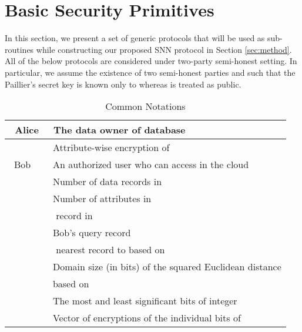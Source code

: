 \documentclass{article}
\begin{document}
\section{ Basic Security Primitives}\label{sec:sub-methods}
In this section, we present a set of generic protocols that will be used 
as sub-routines while constructing our proposed SNN protocol in Section \ref{sec:method}. All of 
the below protocols are considered under two-party semi-honest setting. In particular, 
we assume the existence of two semi-honest parties  and  such that the 
Paillier's secret key  is known only to  whereas  is treated as public. 
\begin{table}[t]
\caption{Common Notations}
\centering
\renewcommand{\arraystretch}{1.3}
\begin{tabular}{| l | l |}
\hline
~Alice & ~The data owner of database \\
\hline
~ & ~Attribute-wise encryption of  \\ 
\hline
~Bob & ~An authorized user who can access  in the cloud \\
\hline
~ & ~Number of data records in \\
\hline
~ & ~Number of attributes in  \\
\hline
~ & ~ record in  \\
\hline
~ & ~Bob's query record \\
\hline
~ & ~ nearest record to  based on \\
\hline
~ & ~Domain size (in bits) of the squared Euclidean distance\\
& ~based on  \\
\hline
~ & ~The most and least significant bits of integer \\
\hline
~ & ~Vector of encryptions of the individual bits of \\
\hline 
\end{tabular}
\label{tb:notations}
\end{table}
  
\end{document}
